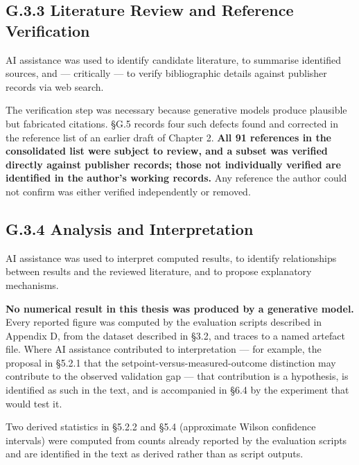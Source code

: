 \hypertarget{g.3.3-literature-review-and-reference-verification}{%
\subsection{G.3.3 Literature Review and Reference Verification}\label{g.3.3-literature-review-and-reference-verification}}

AI assistance was used to identify candidate literature, to summarise identified sources, and --- critically --- to verify bibliographic details against publisher records via web search.

The verification step was necessary because generative models produce plausible but fabricated citations. §G.5 records four such defects found and corrected in the reference list of an earlier draft of Chapter 2. \textbf{All 91 references in the consolidated list were subject to review, and a subset was verified directly against publisher records; those not individually verified are identified in the author's working records.} Any reference the author could not confirm was either verified independently or removed.

\hypertarget{g.3.4-analysis-and-interpretation}{%
\subsection{G.3.4 Analysis and Interpretation}\label{g.3.4-analysis-and-interpretation}}

AI assistance was used to interpret computed results, to identify relationships between results and the reviewed literature, and to propose explanatory mechanisms.

\textbf{No numerical result in this thesis was produced by a generative model.} Every reported figure was computed by the evaluation scripts described in Appendix D, from the dataset described in §3.2, and traces to a named artefact file. Where AI assistance contributed to interpretation --- for example, the proposal in §5.2.1 that the setpoint-versus-measured-outcome distinction may contribute to the observed validation gap --- that contribution is a hypothesis, is identified as such in the text, and is accompanied in §6.4 by the experiment that would test it.

Two derived statistics in §5.2.2 and §5.4 (approximate Wilson confidence intervals) were computed from counts already reported by the evaluation scripts and are identified in the text as derived rather than as script outputs.

